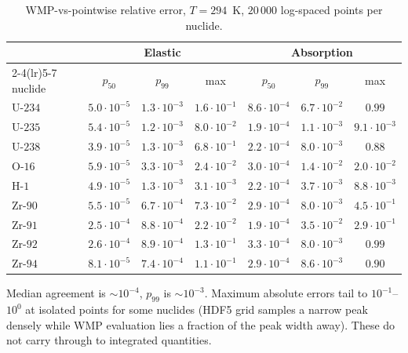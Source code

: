 \begin{table}[t]
\centering
\caption{WMP-vs-pointwise relative error, $T = 294$~K,
$20\,000$ log-spaced points per nuclide.}
\label{tab:hybrid_acc}
\begin{tabular}{@{}lcccccc@{}}
\toprule
 & \multicolumn{3}{c}{Elastic} & \multicolumn{3}{c}{Absorption} \\
\cmidrule(lr){2-4}\cmidrule(lr){5-7}
nuclide & $p_{50}$ & $p_{99}$ & max & $p_{50}$ & $p_{99}$ & max \\
\midrule
U-$234$ & $5.0 \cdot 10^{-5}$ & $1.3 \cdot 10^{-3}$ & $1.6 \cdot 10^{-1}$
        & $8.6 \cdot 10^{-4}$ & $6.7 \cdot 10^{-2}$ & $0.99$ \\
U-$235$ & $5.4 \cdot 10^{-5}$ & $1.2 \cdot 10^{-3}$ & $8.0 \cdot 10^{-2}$
        & $1.9 \cdot 10^{-4}$ & $1.1 \cdot 10^{-3}$ & $9.1 \cdot 10^{-3}$ \\
U-$238$ & $3.9 \cdot 10^{-5}$ & $1.3 \cdot 10^{-3}$ & $6.8 \cdot 10^{-1}$
        & $2.2 \cdot 10^{-4}$ & $8.0 \cdot 10^{-3}$ & $0.88$ \\
O-$16$  & $5.9 \cdot 10^{-5}$ & $3.3 \cdot 10^{-3}$ & $2.4 \cdot 10^{-2}$
        & $3.0 \cdot 10^{-4}$ & $1.4 \cdot 10^{-2}$ & $2.0 \cdot 10^{-2}$ \\
H-$1$   & $4.9 \cdot 10^{-5}$ & $1.3 \cdot 10^{-3}$ & $3.1 \cdot 10^{-3}$
        & $2.2 \cdot 10^{-4}$ & $3.7 \cdot 10^{-3}$ & $8.8 \cdot 10^{-3}$ \\
Zr-$90$ & $5.5 \cdot 10^{-5}$ & $6.7 \cdot 10^{-4}$ & $7.3 \cdot 10^{-2}$
        & $2.9 \cdot 10^{-4}$ & $8.0 \cdot 10^{-3}$ & $4.5 \cdot 10^{-1}$ \\
Zr-$91$ & $2.5 \cdot 10^{-4}$ & $8.8 \cdot 10^{-4}$ & $2.2 \cdot 10^{-2}$
        & $1.9 \cdot 10^{-4}$ & $3.5 \cdot 10^{-2}$ & $2.9 \cdot 10^{-1}$ \\
Zr-$92$ & $2.6 \cdot 10^{-4}$ & $8.9 \cdot 10^{-4}$ & $1.3 \cdot 10^{-1}$
        & $3.3 \cdot 10^{-4}$ & $8.0 \cdot 10^{-3}$ & $0.99$ \\
Zr-$94$ & $8.1 \cdot 10^{-5}$ & $7.4 \cdot 10^{-4}$ & $1.1 \cdot 10^{-1}$
        & $2.9 \cdot 10^{-4}$ & $8.6 \cdot 10^{-3}$ & $0.90$ \\
\bottomrule
\end{tabular}
\end{table}

Median agreement is $\sim\!10^{-4}$, $p_{99}$ is
$\sim\!10^{-3}$. Maximum absolute errors tail to
$10^{-1}$--$10^{0}$ at isolated points for some nuclides
(HDF5 grid samples a narrow peak densely while WMP
evaluation lies a fraction of the peak width away). These do
not carry through to integrated quantities.


